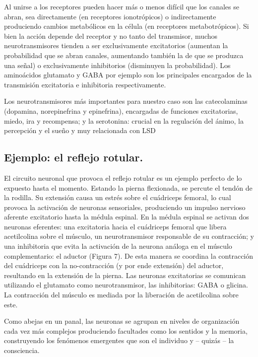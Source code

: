 Al unirse a los receptores pueden hacer más o menos difícil que los canales se abran, sea directamente (en receptores ionotrópicos) o indirectamente produciendo cambios metabólicos en la célula (en receptores metabotrópicos). Si bien la acción depende del receptor y no tanto del transmisor, muchos neurotransmisores tienden a ser exclusivamente excitatorios (aumentan la probabilidad que se abran canales, aumentando también la de que se produzca una señal) o exclusivamente inhibitorios (disminuyen la probabilidad). Los aminoácidos glutamato y GABA por ejemplo son los principales encargados de la transmisión excitatoria e inhibitoria respectivamente.

Los neurotransmisores más importantes para nuestro caso son las catecolaminas (dopamina, norepinefrina y epinefrina), encargadas de funciones excitatorias, miedo, ira y recompensa; y la serotonina: crucial en la regulación del ánimo, la percepción y el sueño y muy relacionada con LSD

\subsection{Ejemplo: el reflejo rotular.}

El circuito neuronal que provoca el reflejo rotular es un ejemplo perfecto de lo expuesto hasta el momento. Estando la pierna flexionada, se percute el tendón de la rodilla. Su extensión causa un estrés sobre el cuádriceps femoral, lo cual provoca la activación de neuronas sensoriales, produciendo un impulso nervioso aferente excitatorio hasta la médula espinal. En la médula espinal se activan dos neuronas eferentes: una excitatoria hacia el cuádriceps femoral que libera acetilcolina sobre el músculo, un neurotransmisor responsable de su contracción; y una inhibitoria que evita la activación de la neurona análoga en el músculo complementario: el aductor (Figura 7). De esta manera se coordina la contracción del cuádriceps con la no-contracción (y por ende extensión) del aductor, resultando en la extensión de la pierna. Las neuronas excitatorias se comunican utilizando el glutamato como neurotransmisor, las inhibitorias: GABA o glicina. La contracción del músculo es mediada por la liberación de acetilcolina sobre este.


Como abejas en un panal, las neuronas se agrupan en niveles de organización cada vez más complejos produciendo facultades como los sentidos y la memoria, construyendo los fenómenos emergentes que son el individuo y – quizás – la consciencia.

